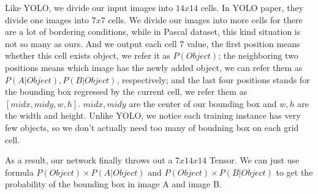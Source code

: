 \documentclass[12pt]{article}
\begin{document}
Like YOLO, we divide our input images into $14x14$ cells. In YOLO paper, they divide one images into $7x7$ cells. We divide our images into more cells for there are a lot of bordering conditions, while in Pascal dataset, this kind situation is not so many as ours. And we output each cell $7$ value, the first position means whether this cell exists object, we refer it as $P(Object)$; the neighboring two positions means which image has the newly added object, we can refer them as $P(A|Object), P(B|Object)$, respectively; and the last four positions stands for the bounding box regressed by the current cell, we refer them as $[midx, midy, w, h]$. $midx, midy$ are the center of our bounding box and $w, h$ are the width and height. Unlike YOLO, we notice each training instance has very few objects, so we don't actually need too many of boudning box on each grid cell.

As a result, our network finally throws out a $7x14x14$ Tensor. We can just use formula $P(Object)\times P(A|Object)$ and $P(Object) \times P(B|Object)$ to get the probability of the bounding box in image A and image B.
\end{document}
